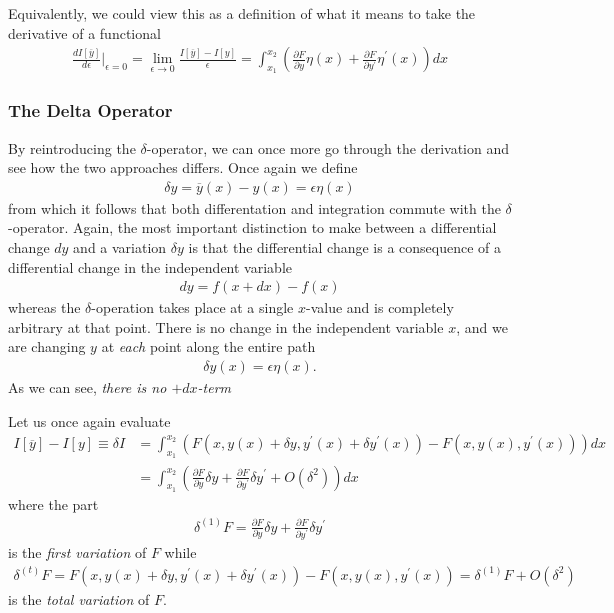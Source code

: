 \documentclass[a4paper]{article}
\begin{document}
    Equivalently, we could view this as a definition of what it means to take the derivative of a functional
    \begin{align*}
        \frac{dI[\overline{y}]}{d\epsilon }\biggr|_{\epsilon = 0} = \lim_{\epsilon \to 0} \frac{I[\overline{y}] - I[y]}{\epsilon} =  \int _{x_1}^{x_2} \left(\frac{\partial F}{\partial y}\eta(x) + \frac{\partial F}{\partial y^{\prime}} \eta^{\prime} (x)\right) dx
    \end{align*}


    \subsubsection{The Delta Operator}
    By reintroducing the \(\delta\)-operator, we can once more go through the derivation and see how the two approaches differs. Once again we define \begin{align*}
        \delta y = \overline{y}(x) - y(x) = \epsilon \eta (x)
    \end{align*} 
    from which it follows that both differentation and integration commute with the \(\delta\)-operator. Again, the most important distinction to make between a differential change \(dy\) and a variation \(\delta y\) is that the differential change is a consequence of a differential change in the independent variable 
    \begin{align*}
        dy = f(x + dx) - f(x)
    \end{align*}
    whereas the \(\delta\)-operation takes place at a single \(x\)-value and is completely arbitrary at that point. There is no change in the independent variable \(x\), and we are changing \(y\) at \textit{each} point along the entire path \begin{align*}
        \delta y(x) = \epsilon \eta (x).
    \end{align*}
    As we can see, \textit{there is no \(+ dx\)-term}
    
    Let us once again evaluate \begin{align*}
        I[\overline{y}] - I[y] \equiv \delta I &= \int _{x_1}^{x_2} \left( F(x, y(x) + \delta y, y^{\prime} (x) + \delta y^{\prime} (x)) - F(x, y(x), y^{\prime} (x)) \right)dx\\
        &= \int _{x_1}^{x_2} \left( \frac{\partial F}{\partial y} \delta y + \frac{\partial F}{\partial y^{\prime} } \delta y^{\prime} + O(\delta^2) \right) dx
    \end{align*}
    where the part \begin{align*}
        \delta^{(1)} F = \frac{\partial F}{\partial y} \delta y + \frac{\partial F}{\partial y^{\prime} } \delta y^{\prime}
    \end{align*}
    is the \textit{first variation} of \(F\) while \begin{align*}
        \delta ^{(t)}F = F(x, y(x) + \delta y, y^{\prime} (x) + \delta y^{\prime} (x)) - F(x, y(x), y^{\prime} (x)) = \delta^{(1)} F + O({\delta ^{2}})
    \end{align*}  
    is the \textit{total variation} of \(F\). 
\end{document}
